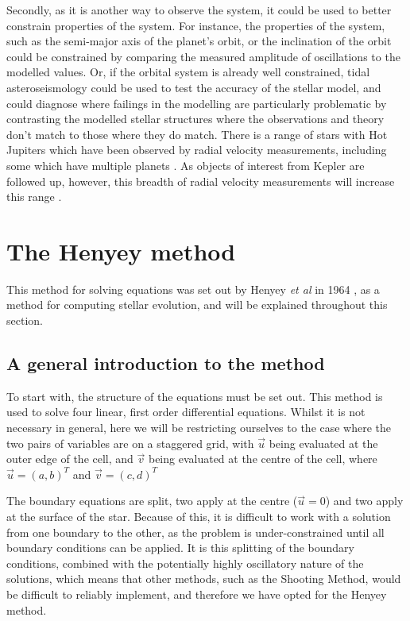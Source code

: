 \documentclass[11pt]{amsart}
\begin{document}
Secondly, as it is another way to observe the system, it could be used to better constrain properties of the system.  For instance, the properties of the system, such as the semi-major axis of the planet's orbit, or the inclination of the orbit could be constrained by comparing the measured amplitude of oscillations to the modelled values.  Or, if the orbital system is already well constrained, tidal asteroseismology could be used to test the accuracy of the stellar model, and could diagnose where failings in the modelling are particularly problematic by contrasting the modelled stellar structures where the observations and theory don't match to those where they do match.  There is a range of stars with Hot Jupiters which have been observed by radial velocity measurements, including some which have multiple planets \cite{NASAExoplanet}.  As objects of interest from Kepler are followed up, however, this  breadth of radial velocity measurements will increase this range \cite{Crouzet2017}.











\section{The Henyey method}   \label{Henyey}

This method for solving equations was set out by Henyey \textit{et al} in 1964 \cite{Henyey1964}, as a method for computing stellar evolution, and will be explained throughout this section. 

\subsection{A general introduction to the method}  \label{Henyey:General}

To start with, the structure of the equations must be set out.  This method is used to solve four linear, first order differential equations.  Whilst it is not necessary in general, here we will be restricting ourselves to the case where the two pairs of variables are on a staggered grid, with $\vec{u}$ being evaluated at the outer edge of the cell, and $\vec{v}$ being evaluated at the centre of the cell, where $\vec{u} = \left( a, b \right)^{T}$ and $\vec{v} = \left( c, d \right)^{T}$

The boundary equations are split, two apply at the centre ($\vec{u} = 0$) and two apply at the surface of the star.  Because of this, it is difficult to work with a solution from one boundary to the other, as the problem is under-constrained until all boundary conditions can be applied.  It is this splitting of the boundary conditions, combined with the potentially highly oscillatory nature of the solutions, which means that other methods, such as the Shooting Method, would be difficult to reliably implement, and therefore we have opted for the Henyey method.
\end{document}
